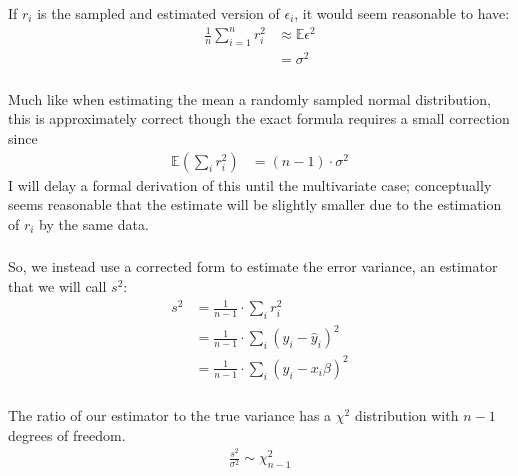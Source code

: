 \begin{frame}[fragile] \frametitle{}

If $r_i$ is the sampled and estimated version of $\epsilon_i$,
it would seem reasonable to have:
\begin{align*}
\frac{1}{n} \sum_{i=1}^n r_i^2 &\approx \mathbb{E} \epsilon^2 \\
&= \sigma^2
\end{align*}

\end{frame}

\begin{frame}[fragile] \frametitle{}

Much like when estimating the mean a randomly sampled normal
distribution, this is approximately correct though the exact
formula requires a small correction since\pause
\begin{align*}
\mathbb{E} \left( \sum_i r_i^2 \right) &= (n-1) \cdot \sigma^2
\end{align*}
\pause I will delay a formal derivation of this until the multivariate
case; conceptually seems reasonable that the estimate will be slightly
smaller due to the estimation of $r_i$ by the same data.

\end{frame}


\begin{frame}[fragile] \frametitle{}

So, we instead use a corrected form to estimate the error
variance, an estimator that we will call $s^2$:
\begin{align*}
s^2 &= \frac{1}{n-1} \cdot \sum_i r_i^2 \\
&= \frac{1}{n-1} \cdot \sum_i (y_i - \widehat{y}_i)^2 \\
&= \frac{1}{n-1} \cdot \sum_i (y_i - x_i \beta)^2
\end{align*}

\end{frame}

\begin{frame}[fragile] \frametitle{}

The ratio of our estimator to the true variance has
a $\chi^2$ distribution with $n-1$ degrees of freedom.
\begin{align*}
\frac{s^2}{\sigma^2} \sim \chi^2_{n - 1}
\end{align*}

\end{frame}

